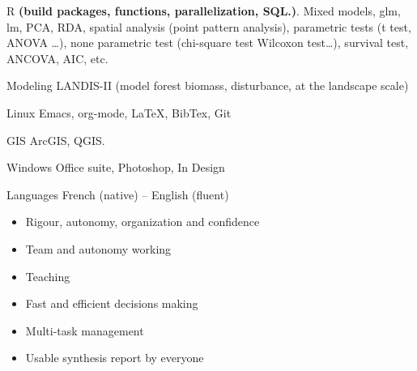 



\begin{multicols}{2}[]
  \begin{cvskillscols}


  \cvskillscol
    {R } %
    {\textnormal{\textbf{(build packages, functions, parallelization, SQL.)}. Mixed models, glm, lm, PCA, RDA, spatial analysis (point pattern analysis), parametric tests (t test, ANOVA …), none parametric test (chi-square test Wilcoxon test…), survival test, ANCOVA, AIC, etc.}} %

  \cvskillscol
    {Modeling} %
    {\textnormal{LANDIS-II (model forest biomass, disturbance, at the landscape scale)}} %

  \cvskillscol
    {Linux} %
    {\textnormal{Emacs, org-mode, {\LaTeX}, BibTex, Git}} %

  \cvskillscol
    {GIS} %
    {\textnormal{ArcGIS, QGIS.}} %
    
  \cvskillscol
    {Windows} %
    {\textnormal{Office suite, Photoshop, In Design}} %
    
  \cvskillscol
    {Languages} %
    {\textnormal{French (native) – English (fluent)}} %

\end{cvskillscols}

\columnbreak


\begin{itemize}[label={}]
\item {Rigour, autonomy, organization and confidence}
\item {Team and autonomy working}
\item {Teaching}
\item {Fast and efficient decisions making}
\item {Multi-task management}
\item {Usable synthesis report by everyone}
\end{itemize}
\end{multicols}

